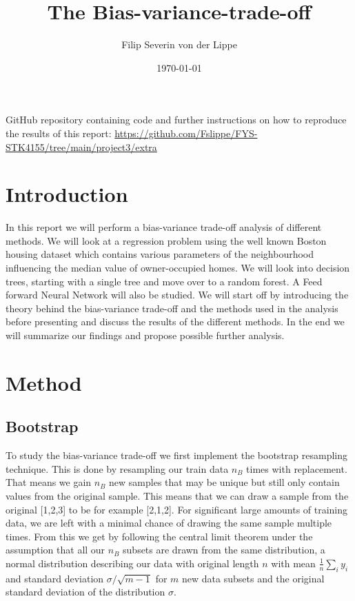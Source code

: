 \documentclass[11pt]{article}
\title{The Bias-variance-trade-off}
\author{Filip Severin von der Lippe}
\date{\today}
\begin{document}
\maketitle
GitHub repository containing code and further instructions on how to reproduce the results of this report: \url{https://github.com/Fslippe/FYS-STK4155/tree/main/project3/extra}

\section{Introduction}
In this report we will perform a bias-variance trade-off analysis of different methods. We will look at a regression problem using the well known Boston housing dataset which contains various parameters of the neighbourhood influencing the median value of owner-occupied homes. We will look into decision trees, starting with a single tree and move over to a random forest. A Feed forward Neural Network will also be studied. We will start off by introducing the theory behind the bias-variance trade-off and the methods used in the analysis before presenting and discuss the results of the different methods. In the end we will summarize our findings and propose possible further analysis.

\section{Method}
\subsection*{Bootstrap}

To study the bias-variance trade-off we first implement the bootstrap resampling technique. This is done by resampling our train data $n_B$ times with replacement. That means we gain $n_B$ new samples that may be unique but still only contain values from the original sample. This means that we can draw a sample from the original [1,2,3] to be for example [2,1,2]. For significant large amounts of training data, we are left with a minimal chance of drawing the same sample multiple times. From this we get by following the central limit theorem under the assumption that all our $n_B$ subsets are drawn from the same distribution, a normal distribution describing our data with original length $n$ with mean $\frac{1}{n}\sum_i y_i$
and standard deviation $\sigma/ \sqrt{m-1}$ for $m$ new data subsets and the original standard deviation of the distribution $\sigma$.
\end{document}
